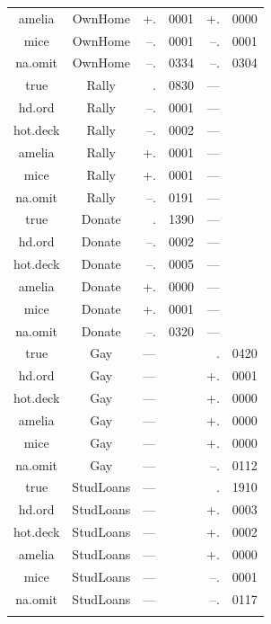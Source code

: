 \documentclass[12pt,econ]{sources/authesis}
\begin{document}
\begin{longtable}{ccr@{}lr@{}l}
 amelia & OwnHome & +.&0001 & +.&0000 \\ 
 mice & OwnHome & --.&0001 & --.&0001 \\
 na.omit & OwnHome & --.&0334 & --.&0304 \\
 true & Rally & .&0830 & --- \\
 hd.ord & Rally & --.&0001 & --- \\ 
 hot.deck & Rally & --.&0002 & --- \\ 
 amelia & Rally & +.&0001 & --- \\ 
 mice & Rally & +.&0001 & --- \\ 
 na.omit & Rally & --.&0191 & --- \\ 
 true & Donate & .&1390 & --- \\ 
 hd.ord & Donate & --.&0002 & --- \\ 
 hot.deck & Donate & --.&0005 & --- \\
 amelia & Donate & +.&0000 & --- \\ 
 mice & Donate & +.&0001 & --- \\ 
 na.omit & Donate & --.&0320 & --- \\ 
 true & Gay & \multicolumn{2}{l}{---} & .&0420 \\ 
 hd.ord & Gay & \multicolumn{2}{l}{---}  & +.&0001 \\
 hot.deck & Gay & \multicolumn{2}{l}{---} & +.&0000 \\ 
 amelia & Gay & \multicolumn{2}{l}{---} & +.&0000 \\
 mice & Gay & \multicolumn{2}{l}{---} & +.&0000 \\
 na.omit & Gay & \multicolumn{2}{l}{---} &  --.&0112 \\
 true & StudLoans & \multicolumn{2}{l}{---} & .&1910 \\
 hd.ord & StudLoans & \multicolumn{2}{l}{---} & +.&0003 \\
 hot.deck & StudLoans & \multicolumn{2}{l}{---} & +.&0002 \\
 amelia & StudLoans & \multicolumn{2}{l}{---} & +.&0000 \\
 mice & StudLoans & \multicolumn{2}{l}{---} & --.&0001 \\
 na.omit & StudLoans & \multicolumn{2}{l}{---} & --.&0117 \\ 
 \hline \\[-1.8ex]
 \end{longtable}
\dsp

\normalsize
\end{document}
